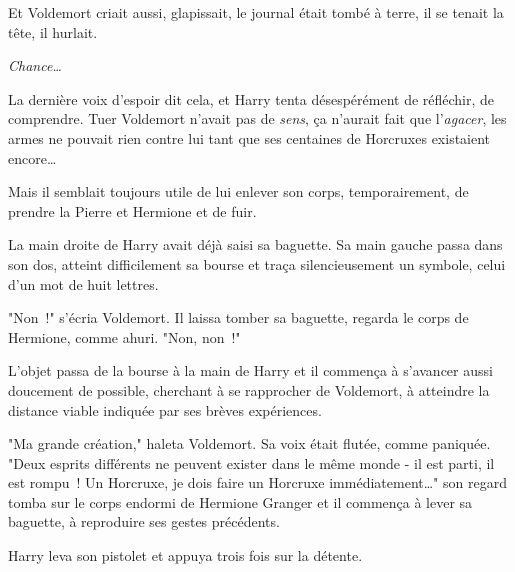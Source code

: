 Et Voldemort criait aussi, glapissait, le journal était tombé à terre, il se tenait la tête, il hurlait.

\emph{Chance…}

La dernière voix d'espoir dit cela, et Harry tenta désespérément de réfléchir, de comprendre. Tuer Voldemort n'avait pas de \emph{sens}, ça n'aurait fait que l'\emph{agacer}, les armes ne pouvait rien contre lui tant que ses centaines de Horcruxes existaient encore…

Mais il semblait toujours utile de lui enlever son corps, temporairement, de prendre la Pierre et Hermione et de fuir.

La main droite de Harry avait déjà saisi sa baguette. Sa main gauche passa dans son dos, atteint difficilement sa bourse et traça silencieusement un symbole, celui d'un mot de huit lettres.

"Non~!" s'écria Voldemort. Il laissa tomber sa baguette, regarda le corps de Hermione, comme ahuri. "Non, non~!"

L'objet passa de la bourse à la main de Harry et il commença à s'avancer aussi doucement de possible, cherchant à se rapprocher de Voldemort, à atteindre la distance viable indiquée par ses brèves expériences.

"Ma grande création," haleta Voldemort. Sa voix était flutée, comme paniquée. "Deux esprits différents ne peuvent exister dans le même monde - il est parti, il est rompu~! Un Horcruxe, je dois faire un Horcruxe immédiatement…" son regard tomba sur le corps endormi de Hermione Granger et il commença à lever sa baguette, à reproduire ses gestes précédents.

Harry leva son pistolet et appuya trois fois sur la détente. 

